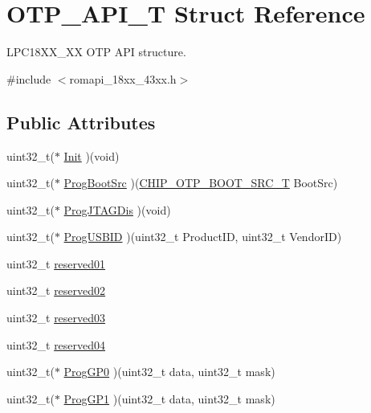 \hypertarget{struct_o_t_p___a_p_i___t}{}\section{O\+T\+P\+\_\+\+A\+P\+I\+\_\+T Struct Reference}
\label{struct_o_t_p___a_p_i___t}


L\+P\+C18\+X\+X\+\_\+XX O\+TP A\+PI structure.  




{\ttfamily \#include $<$romapi\+\_\+18xx\+\_\+43xx.\+h$>$}

\subsection*{Public Attributes}
\begin{DoxyCompactItemize}
\item 
uint32\+\_\+t($\ast$ \hyperlink{struct_o_t_p___a_p_i___t_ae3ce2662765ced30b77691a783595f2e}{Init} )(void)
\item 
uint32\+\_\+t($\ast$ \hyperlink{struct_o_t_p___a_p_i___t_a763052826438d473aefbeb87e1c2ffa4}{Prog\+Boot\+Src} )(\hyperlink{group___o_t_p__18_x_x__43_x_x_gada36d39d34c8821f0416a852faa926f6}{C\+H\+I\+P\+\_\+\+O\+T\+P\+\_\+\+B\+O\+O\+T\+\_\+\+S\+R\+C\+\_\+T} Boot\+Src)
\item 
uint32\+\_\+t($\ast$ \hyperlink{struct_o_t_p___a_p_i___t_a24381835a4d8110c36b6b7ea70788660}{Prog\+J\+T\+A\+G\+Dis} )(void)
\item 
uint32\+\_\+t($\ast$ \hyperlink{struct_o_t_p___a_p_i___t_ad1c64e2d8f88373e4a4766c12f05da33}{Prog\+U\+S\+B\+ID} )(uint32\+\_\+t Product\+ID, uint32\+\_\+t Vendor\+ID)
\item 
uint32\+\_\+t \hyperlink{struct_o_t_p___a_p_i___t_a76a535f69876671e095142788aeb1547}{reserved01}
\item 
uint32\+\_\+t \hyperlink{struct_o_t_p___a_p_i___t_a3e4f749ab03c9fd961c90e0741002e8d}{reserved02}
\item 
uint32\+\_\+t \hyperlink{struct_o_t_p___a_p_i___t_aaac0cb79bf1f4f7ee2d7099a893646ca}{reserved03}
\item 
uint32\+\_\+t \hyperlink{struct_o_t_p___a_p_i___t_a27a448718c0d46bd60f41d4fe9c77c17}{reserved04}
\item 
uint32\+\_\+t($\ast$ \hyperlink{struct_o_t_p___a_p_i___t_a602d126fb1fed0fe8e0588132a02a8ba}{Prog\+G\+P0} )(uint32\+\_\+t data, uint32\+\_\+t mask)
\item 
uint32\+\_\+t($\ast$ \hyperlink{struct_o_t_p___a_p_i___t_a4cec379080f6a888ef102fd9b43d2354}{Prog\+G\+P1} )(uint32\+\_\+t data, uint32\+\_\+t mask)

\end{DoxyCompactItemize}
